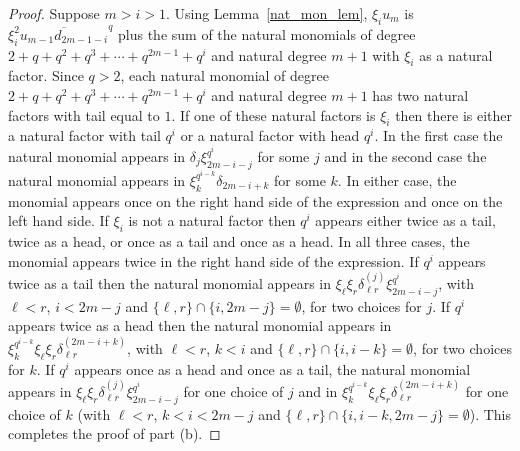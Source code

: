 \documentclass{amsart}
\begin{document}
\begin{proof}
Suppose $m>i>1$. Using Lemma~\ref{nat_mon_lem}, $\xi_i u_m$ is $\xi_i^2 \overline{u_{m-1}d_{2m-1-i}}^q$ 
plus the sum of the natural monomials of degree
$2+q+q^2+q^3+\cdots +q^{2m-1}+q^i$ and natural degree $m+1$ with $\xi_i$ 
 as a natural factor. 
Since $q>2$, each natural monomial of degree $2+q+q^2+q^3+\cdots +q^{2m-1}+q^i$ and natural degree $m+1$ 
has two natural factors with tail equal to $1$.
If one of these natural factors is $\xi_i$ then there is either a natural factor with tail $q^i$ or a natural factor with head $q^i$.
In the first case the natural monomial appears in $\delta_j\xi_{2m-i-j}^{q^i}$ for some $j$ and in the second case
the natural monomial appears in $\xi_k^{q^{i-k}}\delta_{2m-i+k}$ for some $k$.
In either case, the monomial appears once on the right hand side of the expression and once on the left hand side.
If $\xi_i$ is not a natural factor then $q^i$ appears either twice as a tail, twice as a head, or once as a tail and once as a head.
In all three cases, the monomial appears twice in the right hand side of the expression. If $q^i$ appears twice as a tail then the natural monomial
appears in $\xi_{\ell}\xi_r\delta_{\ell r}^{(j)}\xi_{2m-i-j}^{q^i}$,
with $\ell<r$, $i<2m-j$ and $\{\ell,r\}\cap\{i,2m-j\}=\emptyset$,
for two choices for $j$.
If $q^i$ appears twice as a head then the natural monomial
appears in $\xi_k^{q^{i-k}}\xi_{\ell}\xi_r\delta_{\ell r}^{(2m-i+k)}$,
with $\ell<r$, $k<i$ and $\{\ell,r\}\cap\{i,i-k\}=\emptyset$,
for two choices for $k$. If $q^i$ appears once as a head and once as a tail,
the natural monomial appears in 
$\xi_{\ell}\xi_r\delta_{\ell r}^{(j)}\xi_{2m-i-j}^{q^i}$
for one choice of $j$ and in
$\xi_k^{q^{i-k}}\xi_{\ell}\xi_r\delta_{\ell r}^{(2m-i+k)}$
for one choice of $k$ (with $\ell<r$, $k<i<2m-j$
and $\{\ell,r\}\cap\{i,i-k,2m-j\}=\emptyset$).
This completes the proof of part (b).
\end{proof}
\end{document}
